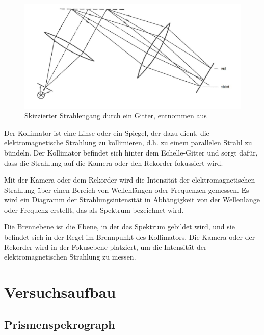 \documentclass[12pt,english,ngerman]{scrartcl}
\begin{document}
\begin{figure}[H]
	\begin{center}
		\includegraphics[width =\textwidth]{./figures/skizze_gitter.png}
	\end{center}
	\caption[Skizzierter Strahlengang durch ein Gitter]
	{Skizzierter Strahlengang durch ein Gitter, entnommen aus \cite{unterlagen}
	}\label{fig:gitter}
\end{figure}


Der Kollimator ist eine Linse oder ein Spiegel, der dazu dient, die elektromagnetische Strahlung zu kollimieren, d.h. zu 
einem parallelen Strahl zu bündeln. Der Kollimator befindet sich hinter dem Echelle-Gitter und sorgt dafür, dass die 
Strahlung auf die Kamera oder den Rekorder fokussiert wird.

Mit der Kamera oder dem Rekorder wird die Intensität der elektromagnetischen Strahlung über einen Bereich von Wellenlängen 
oder Frequenzen gemessen. Es wird ein Diagramm der Strahlungsintensität in Abhängigkeit von der Wellenlänge oder Frequenz 
erstellt, das als Spektrum bezeichnet wird.

Die Brennebene ist die Ebene, in der das Spektrum gebildet wird, und sie befindet sich in der Regel im Brennpunkt des 
Kollimators. Die Kamera oder der Rekorder wird in der Fokusebene platziert, um die Intensität der elektromagnetischen 
Strahlung zu messen.



\section{Versuchsaufbau} \label{sec:aufbau}

\subsection{Prismenspekrograph}
\end{document}
